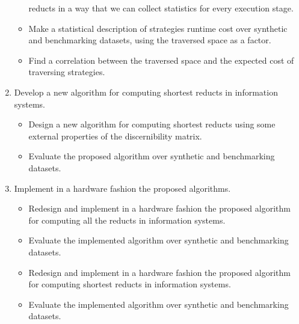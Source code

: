 \documentclass[authoryear,11pt]{elsarticle}
\begin{document}
\begin{enumerate}
\begin{itemize}
  			  reducts in a way that we can collect statistics for every execution stage.
  		\item Make a statistical description  of strategies runtime cost over synthetic and benchmarking datasets,
  			  using the traversed space as a factor.
  		\item Find a correlation between the traversed space and the expected cost of traversing strategies.
  	\end{itemize}
  	\item Develop a new algorithm for computing shortest reducts in information systems.
  	\begin{itemize}
  		\item Design a new algorithm for computing shortest reducts using some external
  		      properties of the discernibility matrix.
  		\item Evaluate the proposed algorithm over synthetic and benchmarking datasets.
  	\end{itemize}
  	\item Implement in a hardware fashion the proposed algorithms.
  	\begin{itemize}
  		\item Redesign and implement in a hardware fashion the proposed algorithm for computing
  			  all the reducts in information systems.
  		\item Evaluate the implemented algorithm over synthetic and benchmarking datasets.
  		\item Redesign and implement in a hardware fashion the proposed algorithm for computing
  			  shortest reducts in information systems.
  		\item Evaluate the implemented algorithm over synthetic and benchmarking datasets.
  	\end{itemize}
\end{enumerate}

\clearpage 
\end{document}
